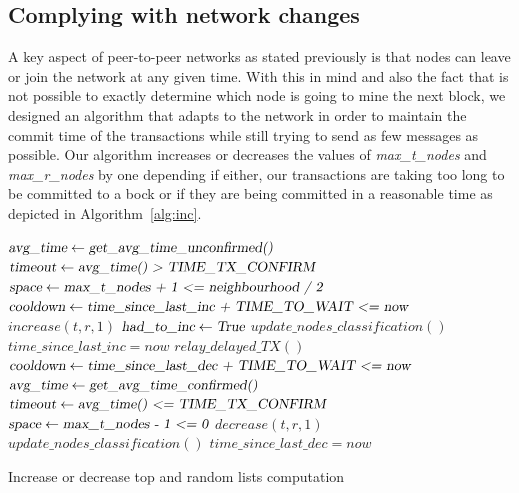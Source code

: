 \documentclass{dads}   %
\begin{document}
\subsection{Complying with network changes}
A key aspect of peer-to-peer networks as stated previously is that nodes can leave or join the network at any given time. With this in mind and also the fact that is not possible to exactly determine which node is going to mine the next block, we designed an algorithm that adapts to the network in order to maintain the commit time of the transactions while still trying to send as few messages as possible. Our algorithm increases or decreases the values of \textsl{max\_t\_nodes} and \textsl{max\_r\_nodes} by one depending if either, our transactions are taking too long to be committed to a bock or if they are being committed in a reasonable time as depicted in Algorithm~\ref{alg:inc}.

\begin{algorithm}[t]
\begin{algorithmic}[1]
\State $\textsl{avg\_time} \gets \textsl{get\_avg\_time\_unconfirmed()}$
\State $\textsl{timeout} \gets \textsl{avg\_time() > TIME\_TX\_CONFIRM}$
\State $\textsl{space} \gets \textsl{max\_t\_nodes + 1 <= neighbourhood / 2}$
\State $\textsl{cooldown} \gets \textsl{time\_since\_last\_inc + TIME\_TO\_WAIT <= now}$
  \State $increase(t, r, 1)$
  \State $\textsl{had\_to\_inc} \gets \textsl{True}$
  \State $update\_nodes\_classification()$
  \State $time\_since\_last\_inc = now$
  \State $relay\_delayed\_TX()$
\EndIf
\State $\textsl{cooldown} \gets \textsl{time\_since\_last\_dec + TIME\_TO\_WAIT <= now}$
  \State $\textsl{avg\_time} \gets \textsl{get\_avg\_time\_confirmed()}$
  \State $\textsl{timeout} \gets \textsl{avg\_time() <= TIME\_TX\_CONFIRM}$
  \State $\textsl{space} \gets \textsl{max\_t\_nodes - 1 <= 0}$
    \State $decrease(t, r, 1)$
    \State $update\_nodes\_classification()$
    \State $time\_since\_last\_dec = now$
  \EndIf
\EndIf
\EndFunction
\end{algorithmic}
\caption{Increase or decrease top and random lists computation}
\label{alg:inc}
\end{algorithm}
\end{document}
